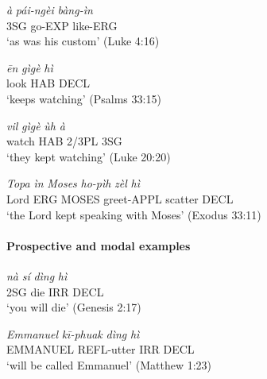 \documentclass[
  11pt,
  a4paper,
]{article}
\newcommand{\tdimword}[1]{\textit{#1}}
\renewcommand{\textsc}[1]{{\footnotesize\MakeUppercase{#1}}}
\newcommand{\glossquote}[1]{`#1'}
\begin{document}
\begin{exe}
\ex \label{ex:tam-paingei-luke4}
\gll \tdimword{à} \tdimword{pái-ngèi} \tdimword{bàng-ìn} \\
     \textsc{3sg} go-\textsc{exp} like-\textsc{erg} \\
\glt \glossquote{as was his custom} (Luke 4:16)
\end{exe}

\begin{exe}
\ex \label{ex:tam-gige-ps33}
\gll \tdimword{ēn} \tdimword{gìgè} \tdimword{hì} \\
     look \textsc{hab} \textsc{decl} \\
\glt \glossquote{keeps watching} (Psalms 33:15)
\end{exe}

\begin{exe}
\ex \label{ex:tam-gige-luke20}
\gll \tdimword{vil} \tdimword{gìgè} \tdimword{ùh} \tdimword{à} \\
     watch \textsc{hab} 2/3PL \textsc{3sg} \\
\glt \glossquote{they kept watching} (Luke 20:20)
\end{exe}

\begin{exe}
\ex \label{ex:tam-zel-exod33}
\gll \tdimword{Topa} \tdimword{ìn} \tdimword{Moses} \tdimword{ho-pìh} \tdimword{zèl} \tdimword{hì} \\
     Lord \textsc{erg} \textsc{moses} greet-\textsc{appl} scatter \textsc{decl} \\
\glt \glossquote{the Lord kept speaking with Moses} (Exodus 33:11)
\end{exe}

\paragraph{Prospective and modal
examples}\label{prospective-and-modal-examples}

\begin{exe}
\ex \label{ex:tam-ding-gen2}
\gll \tdimword{nà} \tdimword{sí} \tdimword{dìng} \tdimword{hì} \\
     \textsc{2sg} die \textsc{irr} \textsc{decl} \\
\glt \glossquote{you will die} (Genesis 2:17)
\end{exe}

\begin{exe}
\ex \label{ex:tam-ding-matt1}
\gll \tdimword{Emmanuel} \tdimword{kī-phuak} \tdimword{dìng} \tdimword{hì} \\
     \textsc{emmanuel} \textsc{refl}-utter \textsc{irr} \textsc{decl} \\
\glt \glossquote{will be called Emmanuel} (Matthew 1:23)
\end{exe}
\end{document}
